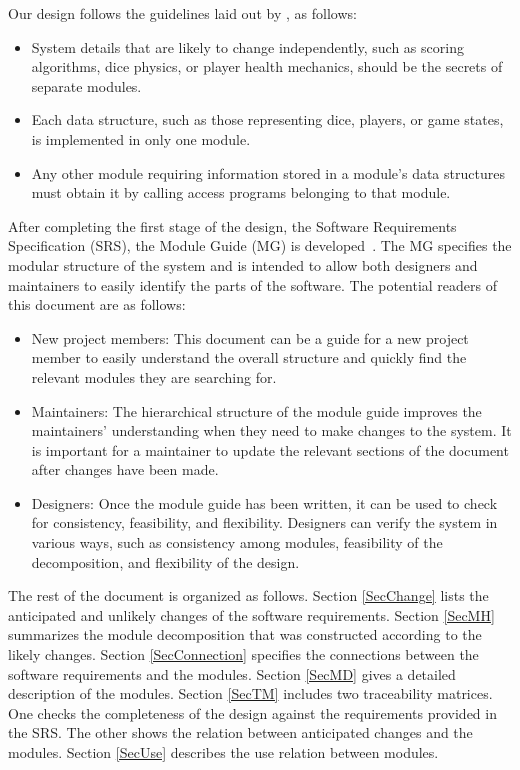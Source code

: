 \documentclass[12pt, titlepage]{article}
\begin{document}
Our design follows the guidelines laid out by \citet{ParnasEtAl1984}, as follows:
\begin{itemize}
\item System details that are likely to change independently, such as scoring algorithms, dice physics, or player health mechanics, should be the secrets of separate modules.
\item Each data structure, such as those representing dice, players, or game states, is implemented in only one module.
\item Any other module requiring information stored in a module's data structures must obtain it by calling access programs belonging to that module.
\end{itemize}

After completing the first stage of the design, the Software Requirements
Specification (SRS), the Module Guide (MG) is developed~\citep{ParnasEtAl1984}. The MG
specifies the modular structure of the system and is intended to allow both
designers and maintainers to easily identify the parts of the software.  The
potential readers of this document are as follows:

\begin{itemize}
\item New project members: This document can be a guide for a new project member
  to easily understand the overall structure and quickly find the
  relevant modules they are searching for.
\item Maintainers: The hierarchical structure of the module guide improves the
  maintainers' understanding when they need to make changes to the system. It is
  important for a maintainer to update the relevant sections of the document
  after changes have been made.
\item Designers: Once the module guide has been written, it can be used to
  check for consistency, feasibility, and flexibility. Designers can verify the
  system in various ways, such as consistency among modules, feasibility of the
  decomposition, and flexibility of the design.
\end{itemize}

The rest of the document is organized as follows. Section
\ref{SecChange} lists the anticipated and unlikely changes of the software
requirements. Section \ref{SecMH} summarizes the module decomposition that
was constructed according to the likely changes. Section \ref{SecConnection}
specifies the connections between the software requirements and the
modules. Section \ref{SecMD} gives a detailed description of the
modules. Section \ref{SecTM} includes two traceability matrices. One checks
the completeness of the design against the requirements provided in the SRS. The
other shows the relation between anticipated changes and the modules. Section
\ref{SecUse} describes the use relation between modules.
\end{document}
